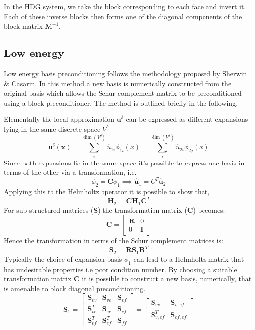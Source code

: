 In the HDG system, we take the block corresponding to each face and invert
it. Each of these inverse blocks then forms one of the diagonal components of
the block matrix $\mathbf{M}^{-1}$.

\subsection{Low energy}

Low energy basis preconditioning follows the methodology proposed by Sherwin \&
Casarin. In this method a new basis is numerically constructed from the original
basis which allows the Schur complement matrix to be preconditioned using a
block preconditioner. The method is outlined briefly in the following.

Elementally the local approximation $\mathbf{u}^{\delta}$ can be expressed as
different expansions lying in the same discrete space $V^{\delta}$
%
\[
\mathbf{u}^{\delta}(\mathbf{x})=\sum_{i}^{\dim(V^{\delta})}\hat{u}_{1i}\phi_{1i}(x)
= \sum_{i}^{\dim(V^{\delta})}\hat{u}_{2i}\phi_{2j}(x)
\]
%
Since both expansions lie in the same space it's possible to express one basis
in terms of the other via a transformation, i.e.
%
\[
\phi_{2}=\mathbf{C}\phi_{1} \implies \hat{\mathbf{u}}_{1}=C^{T}\hat{\mathbf{u}}_{2}
\]
%
Applying this to the Helmholtz operator it is possible to show that,
%
\[
\mathbf{H}_{2}=\mathbf{C}\mathbf{H}_{1}\mathbf{C}^{T}
\]
%
For sub-structured matrices ($\mathbf{S}$) the transformation matrix
($\mathbf{C}$) becomes:
%
\[
\mathbf{C}=\left[ \begin{array}{cc}
\mathbf{R} & 0\\
0 & \mathbf{I}
 \end{array} \right]
\]
%
Hence the transformation in terms of the Schur complement matrices is:
%
\[
\mathbf{S}_{2}=\mathbf{R}\mathbf{S}_{1}\mathbf{R}^{T}
\]
%
Typically the choice of expansion basis $\phi_{1}$ can lead to a Helmholtz
matrix that has undesirable properties i.e poor condition number. By choosing a
suitable transformation matrix $\mathbf{C}$ it is possible to construct a new
basis, numerically, that is amenable to block diagonal preconditioning.
%
\[
\mathbf{S}_{1}=\left[ \begin{array}{ccc}
\mathbf{S}_{vv} & \mathbf{S}_{ve} & \mathbf{S}_{vf}\\
\mathbf{S}^{T}_{ve}& \mathbf{S}_{ee} & \mathbf{S}_{ef} \\
\mathbf{S}^{T}_{vf} & \mathbf{S}^{T}_{ef} & \mathbf{S}_{ff} \end{array} \right] =\left[ \begin{array}{cc}
\mathbf{S}_{vv} & \mathbf{S}_{v,ef} \\
\mathbf{S}^{T}_{v,ef} & \mathbf{S}_{ef,ef} \end{array} \right]
\]

